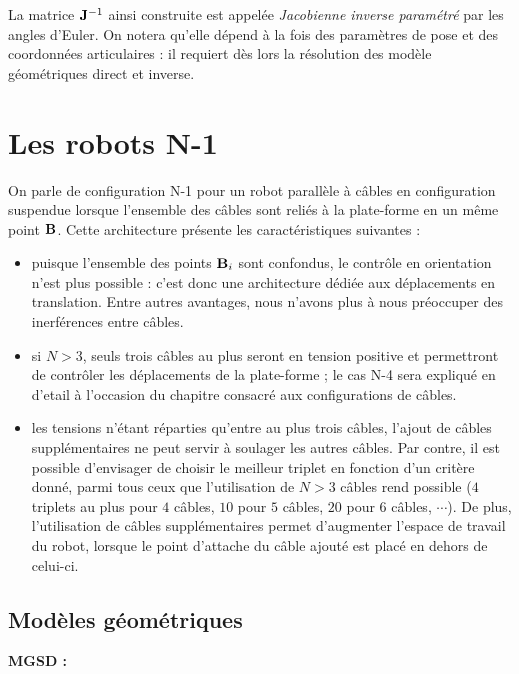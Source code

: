 La matrice ${\bf J}^{-1}$ ainsi construite est appelée {\it Jacobienne 
inverse param\'etr\'e} par les angles d'Euler. On notera qu'elle dépend à la 
fois des paramètres de pose et des coordonnées articulaires : il requiert d\`es 
lors la r\'esolution des mod\`ele g\'eom\'etriques direct et inverse.

\section{Les robots N-1} \label{chap0-2}

On parle de configuration N-1 pour un robot parall\`ele \`a c\^ables en 
configuration suspendue lorsque l'ensemble des c\^ables sont reli\'es \`a la 
plate-forme en un m\^eme point ${\bf B}$. Cette architecture pr\'esente les 
caract\'eristiques suivantes :
\begin{itemize}
  \item puisque l'ensemble des points ${\bf B}_i$ sont confondus, le contr\^ole 
en orientation n'est plus possible : c'est donc une architecture d\'edi\'ee aux 
d\'eplacements en translation. Entre autres avantages, nous n'avons plus \`a 
nous pr\'eoccuper des inerf\'erences entre c\^ables.
  \item si $N > 3$, seuls trois c\^ables au plus seront en tension positive et 
permettront de contr\^oler les d\'eplacements de la plate-forme ; le cas N-4 
sera expliqu\'e en d'etail \`a l'occasion du chapitre consacr\'e aux 
configurations de c\^ables.
  \item les tensions n'\'etant r\'eparties qu'entre au plus trois c\^ables, 
l'ajout de c\^ables suppl\'ementaires ne peut servir \`a soulager les autres 
c\^ables. Par contre, il est possible d'envisager de choisir le meilleur 
triplet 
en fonction d'un crit\`ere donn\'e, parmi tous ceux que l'utilisation de $N>3$ 
c\^ables rend possible ($4$ triplets au plus pour $4$ c\^ables, $10$ pour $5$ 
c\^ables, $20$ pour $6$ c\^ables, $\cdots$). De plus, l'utilisation de c\^ables 
suppl\'ementaires permet d'augmenter l'espace de travail du robot, lorsque le 
point d'attache du c\^able ajout\'e est plac\'e en dehors de celui-ci.
\end{itemize}

\subsection{Mod\`eles g\'eom\'etriques}

{\bf MGSD :}\\

